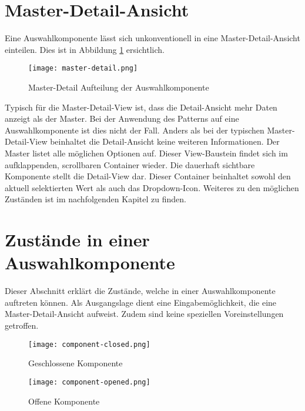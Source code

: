 \section{Master-Detail-Ansicht}
\label{sec:masterDetailView}

Eine Auswahlkomponente lässt sich unkonventionell in eine Master-Detail-Ansicht einteilen. 
Dies ist in Abbildung \ref{img:masterDetailView} ersichtlich. 

\begin{figure}[!htb]
    \centering
    \texttt{[image: master-detail.png]}
    \caption{\centering Master-Detail Aufteilung der Auswahlkomponente}
    \label{img:masterDetailView}
\end{figure}

Typisch für die Master-Detail-View ist, dass die Detail-Ansicht mehr Daten anzeigt als der Master. 
Bei der Anwendung des Patterns auf eine Auswahlkomponente ist dies nicht der Fall. 
Anders als bei der typischen Master-Detail-View beinhaltet die Detail-Ansicht keine weiteren Informationen. 
Der Master listet alle möglichen Optionen auf. 
Dieser View-Baustein findet sich im aufklappenden, scrollbaren Container wieder. 
Die dauerhaft sichtbare Komponente stellt die Detail-View dar. 
Dieser Container beinhaltet sowohl den aktuell selektierten Wert als auch das Dropdown-Icon. 
Weiteres zu den möglichen Zuständen ist im nachfolgenden Kapitel zu finden. 


\section{Zustände in einer Auswahlkomponente}
\label{sec:states}

Dieser Abschnitt erklärt die Zustände, welche in einer Auswahlkomponente auftreten können. 
Als Ausgangslage dient eine Eingabemöglichkeit, die eine Master-Detail-Ansicht aufweist. 
Zudem sind keine speziellen Voreinstellungen getroffen. 

\begin{figure}[!htb]
    \centering
    \begin{minipage}[b]{0.4\textwidth}
        \centering
        \texttt{[image: component-closed.png]}
        \caption{\centering Geschlossene Komponente}
        \label{img:componentClose}
    \end{minipage}
    \hfill
    \begin{minipage}[b]{0.55\textwidth}
        \centering
        \texttt{[image: component-opened.png]}
        \caption{\centering Offene Komponente}
        \label{img:componentOpen}
    \end{minipage}
\end{figure}

